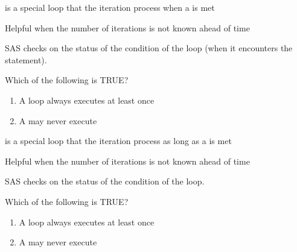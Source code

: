 \begin{frame}

\bi
\item {} is a special loop that  the iteration process when a  is met
\item {} 
\item Helpful when the number of iterations is not known ahead of time
\item {} SAS checks on the status of the condition  of the loop (when it encounters the  statement).
\item[]
\ei
\begin{clicker}{Which of the following is TRUE?}
\begin{enumerate}
\item A  loop always executes at least once %
\item A  may never execute %
\end{enumerate}
\end{clicker}
\end{frame}

\begin{frame}
\bi
\item {} is a special loop that  the iteration process as long as  a  is met
\item {} 
\item Helpful when the number of iterations is not known ahead of time
\item {} SAS checks on the status of the condition  of the loop.
\item[]
\ei
\begin{clicker}{Which of the following is TRUE?}
\begin{enumerate}
\item A  loop always executes at least once %
\item A  may never execute %
\end{enumerate}
\end{clicker}
\end{frame}

